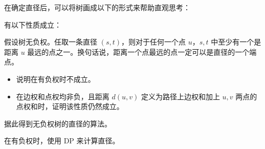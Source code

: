 在确定直径后，可以将树画成以下的形式来帮助直观思考：

\begin{center}
\end{center}

有以下性质成立：

\begin{property}
    假设树无负权。任取一条直径 $(s,t)$，则对于任何一个点 $u$，$s,t$ 中至少有一个是距离 $u$ 最远的点之一。换句话说，距离一个点最远的点一定可以是直径的一个端点。
\end{property}
\begin{exercise}
    \begin{itemize}
        \item 说明在有负权时不成立。
        \item 在边权和点权均非负，且距离 $d(u,v)$ 定义为路径上边权和加上 $u,v$ 两点的点权和时，证明该性质仍然成立。
    \end{itemize}
\end{exercise}
\begin{exercise}
    据此得到无负权树的直径的算法。
\end{exercise}
\begin{exercise}
    在有负权时，使用 DP 来计算直径。
\end{exercise}

